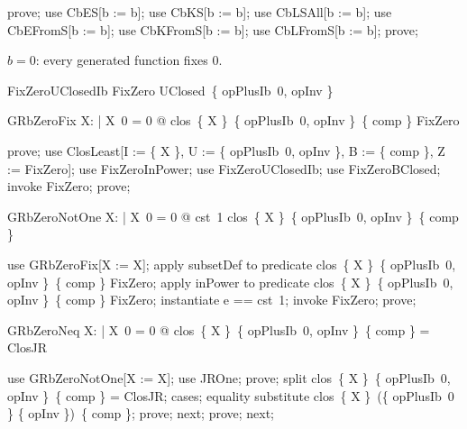 \documentclass{article}
\begin{document}
\begin{zproof}
prove;
use CbES[b := b];
use CbKS[b := b];
use CbLSAll[b := b];
use CbEFromS[b := b];
use CbKFromS[b := b];
use CbLFromS[b := b];
prove;
\end{zproof}

$b = 0$: every generated function fixes $0$.

\begin{theorem}{FixZeroUClosedIb}
  FixZero \in UClosed~\{ opPlusIb~0, opInv \}
\end{theorem}


\begin{theorem}{GRbZeroFix}
  \forall X: \nat \fun \nat | X~0 = 0 @ clos~\{ X \}~\{ opPlusIb~0, opInv \}~\{ comp \} \subseteq FixZero
\end{theorem}

\begin{zproof}
prove;
use ClosLeast[I := \{ X \}, U := \{ opPlusIb~0, opInv \}, B := \{ comp \}, Z := FixZero];
use FixZeroInPower;
use FixZeroUClosedIb;
use FixZeroBClosed;
invoke FixZero;
prove;
\end{zproof}

\begin{theorem}{GRbZeroNotOne}
  \forall X: \nat \fun \nat | X~0 = 0 @ \lnot cst~1 \in clos~\{ X \}~\{ opPlusIb~0, opInv \}~\{ comp \}
\end{theorem}

\begin{zproof}
use GRbZeroFix[X := X];
apply subsetDef to predicate clos~\{ X \}~\{ opPlusIb~0, opInv \}~\{ comp \} \subseteq FixZero;
apply inPower to predicate clos~\{ X \}~\{ opPlusIb~0, opInv \}~\{ comp \} \in \power FixZero;
instantiate e == cst~1;
invoke FixZero;
prove;
\end{zproof}

\begin{theorem}{GRbZeroNeq}
  \forall X: \nat \fun \nat | X~0 = 0 @ \lnot clos~\{ X \}~\{ opPlusIb~0, opInv \}~\{ comp \} = ClosJR
\end{theorem}

\begin{zproof}
use GRbZeroNotOne[X := X];
use JROne;
prove;
split clos~\{ X \}~\{ opPlusIb~0, opInv \}~\{ comp \} = ClosJR;
cases;
equality substitute clos~\{ X \}~(\{ opPlusIb~0 \} \cup \{ opInv \})~\{ comp \};
prove;
next;
prove;
next;
\end{zproof}
\end{document}
